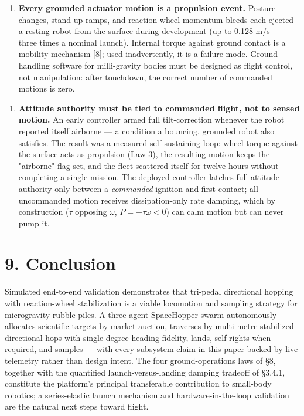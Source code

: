 \documentclass[conference]{IEEEtran}
\begin{document}
\begin{enumerate}
\item \textbf{Every grounded actuator motion is a propulsion event.} Posture changes, stand-up ramps, and reaction-wheel momentum bleeds each ejected a resting robot from the surface during development (up to 0.128 m/s --- three times a nominal launch). Internal torque against ground contact is a mobility mechanism [8]; used inadvertently, it is a failure mode. Ground-handling software for milli-gravity bodies must be designed as flight control, not manipulation: after touchdown, the correct number of commanded motions is zero.
\end{enumerate}

\begin{enumerate}
\item \textbf{Attitude authority must be tied to commanded flight, not to sensed motion.} An early controller armed full tilt-correction whenever the robot reported itself airborne --- a condition a bouncing, grounded robot also satisfies. The result was a measured self-sustaining loop: wheel torque against the surface acts as propulsion (Law 3), the resulting motion keeps the "airborne" flag set, and the fleet scattered itself for twelve hours without completing a single mission. The deployed controller latches full attitude authority only between a \emph{commanded} ignition and first contact; all uncommanded motion receives dissipation-only rate damping, which by construction ($\tau$ opposing $\omega$, $P = -\tau\omega < 0$) can calm motion but can never pump it.
\end{enumerate}

\section*{9. Conclusion}

Simulated end-to-end validation demonstrates that tri-pedal directional hopping with reaction-wheel stabilization is a viable locomotion and sampling strategy for microgravity rubble piles. A three-agent SpaceHopper swarm autonomously allocates scientific targets by market auction, traverses by multi-metre stabilized directional hops with single-degree heading fidelity, lands, self-rights when required, and samples --- with every subsystem claim in this paper backed by live telemetry rather than design intent. The four ground-operations laws of \S8, together with the quantified launch-versus-landing damping tradeoff of \S3.4.1, constitute the platform's principal transferable contribution to small-body robotics; a series-elastic launch mechanism and hardware-in-the-loop validation are the natural next steps toward flight.
\end{document}
